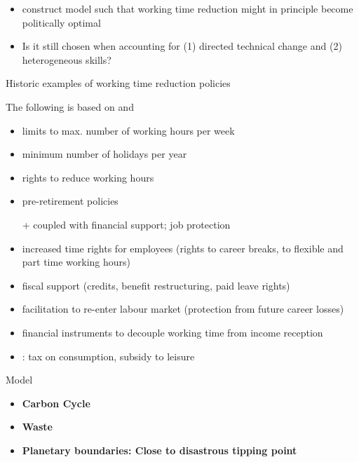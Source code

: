 \documentclass[11pt,aspectratio=169]{beamer}
\begin{document}
\begin{frame}
\begin{itemize}
\item construct model such that working time reduction might in principle become politically optimal
\item Is it still chosen when accounting for (1) directed technical change and (2) heterogeneous skills?
\end{itemize}
\end{frame}
\begin{frame}{Historic examples of working time reduction policies}

The following is based on  \cite{Pullinger2014WorkingDesign} and \cite{Alvarez-Cuadrado2007EnvyHours}
\begin{itemize}
\item limits to max. number of working hours per week
\item minimum number of holidays per year
\item rights to reduce working hours
\item pre-retirement policies
\item[+] coupled with financial support; job protection
\item increased time rights for employees (rights to career breaks, to flexible and part time working hours)
\item fiscal support (credits, benefit restructuring, paid leave rights)
\item  facilitation to re-enter labour market (protection from future career losses)
\item financial instruments to decouple working time from income reception
\item \citep{Alvarez-Cuadrado2007EnvyHours}: tax on consumption, subsidy to leisure
\end{itemize}

\end{frame}
\begin{frame}{Model}
\begin{itemize}
\item \textbf{Carbon Cycle}
\item \textbf{Waste}
\item \textbf{Planetary boundaries: Close to disastrous tipping point }
\end{itemize}
\end{frame}
\end{document}
